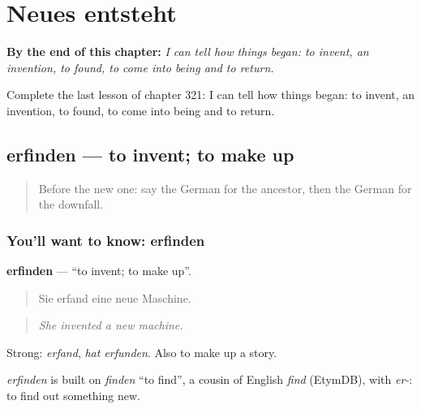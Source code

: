 
\chapter{Neues entsteht}
\label{ch:ge-neues-entsteht}

\begin{chapteropening}
\textbf{By the end of this chapter:} \emph{I can tell how things began: to invent, an invention, to found, to come into being and to return.}

Complete the last lesson of chapter 321: I can tell how things began: to invent, an invention, to found, to come into being and to return.
\end{chapteropening}

\section[erfinden]{erfinden — to invent; to make up}

\label{lesson:GE-C321-erfinden}



\begin{quote}
Before the new one: say the German for the ancestor, then the German for the downfall.
\end{quote}

\subsection*{You'll want to know: erfinden}
\textbf{erfinden} — \textquotedblleft{}to invent; to make up\textquotedblright{}.

\begin{quote}
Sie erfand eine neue Maschine.
\end{quote}

\begin{quote}
\emph{She invented a new machine.}
\end{quote}

Strong: \emph{erfand}, \emph{hat erfunden}. Also to make up a story.

\begin{cousinweb}
\emph{erfinden} is built on \emph{finden} \textquotedblleft{}to find\textquotedblright{}, a cousin of English \emph{find} (EtymDB), with \emph{er-}: to find out something new.
\end{cousinweb}

